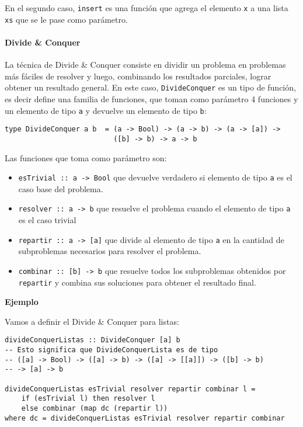 En el segundo caso, \texttt{insert} es una función que agrega el elemento \texttt{x} a una lista \texttt{xs} que se le pase como parámetro.

\paragraph{Divide \& Conquer}
La técnica de Divide \& Conquer consiste en dividir un problema en problemas más fáciles de resolver y luego, combinando los resultados parciales, lograr
obtener un resultado general. En este caso, \texttt{DivideConquer} es un tipo de función, es decir define una familia de funciones, que toman como parámetro 4 funciones y un elemento de tipo \texttt{a} y devuelve un elemento de tipo \texttt{b}:
\begin{centrado}
	\begin{verbatim}
type DivideConquer a b  = (a -> Bool) -> (a -> b) -> (a -> [a]) -> 
                          ([b] -> b) -> a -> b                         
\end{verbatim}
\end{centrado}
Las funciones que toma como parámetro son:
\begin{itemize}
	\item \texttt{esTrivial :: a -> Bool} que devuelve verdadero si elemento de tipo \texttt{a} es el caso base del problema.
	\item \texttt{resolver :: a -> b} que resuelve el problema cuando el elemento de tipo \texttt{a} es el caso trivial
	\item \texttt{repartir :: a -> [a]} que divide al elemento de tipo \texttt{a} en la cantidad de subproblemas necesarios para resolver el problema.
	\item \texttt{combinar :: [b] -> b} que resuelve todos los subproblemas obtenidos por \texttt{repartir} y combina sus soluciones para obtener el resultado final.
\end{itemize}

\textbf{Ejemplo}

Vamos a definir el Divide \& Conquer para listas:
\begin{centrado}
	\begin{verbatim}
divideConquerListas :: DivideConquer [a] b
-- Esto significa que DivideConquerLista es de tipo 
-- ([a] -> Bool) -> ([a] -> b) -> ([a] -> [[a]]) -> ([b] -> b)
-- -> [a] -> b

divideConquerListas esTrivial resolver repartir combinar l =
	if (esTrivial l) then resolver l
	else combinar (map dc (repartir l))
where dc = divideConquerListas esTrivial resolver repartir combinar
                        
	\end{verbatim}
\end{centrado}


